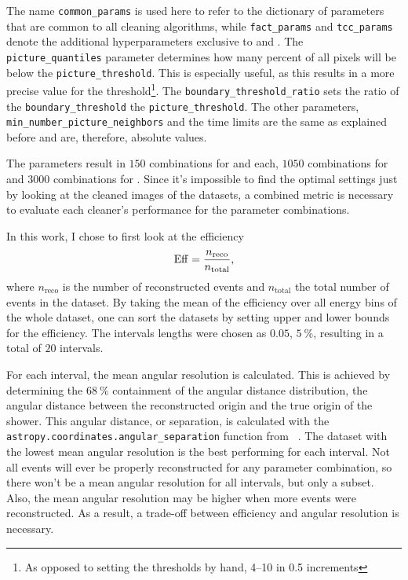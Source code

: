 The name \texttt{common\_params} is used here to refer to the dictionary of parameters that are common
to all cleaning algorithms, while \texttt{fact\_params} and \texttt{tcc\_params} denote the additional
hyperparameters exclusive to \fact{} and \tcc{}. The \texttt{picture\_quantiles} parameter determines
how many percent of all pixels will be below the \texttt{picture\_threshold}. This is especially useful,
as this results in a more precise value for the threshold\footnote{As opposed to setting the thresholds by hand, \eg{} \numrange{4}{10} in \num{0.5} increments}.
The \texttt{boundary\_threshold\_ratio} sets
the ratio of the \texttt{boundary\_threshold} \wrt the \texttt{picture\_threshold}. The other parameters,
\texttt{min\_number\_picture\_neighbors} and the time limits are the same as explained before and are,
therefore, absolute values.

The parameters result in \(\num{150}\) combinations for \tailcuts{} and \mars{} each, \(\num{1050}\) combinations for
\fact{} and \(\num{3000}\) combinations for \tcc{}.
Since it's impossible to find the optimal settings just by looking at the
cleaned images of the datasets, a combined metric is necessary to evaluate each cleaner's performance
for the parameter combinations.

In this work, I chose to first look at the efficiency
\begin{equation}\label{eq:efficiency}
    \operatorname{Eff} =  \frac{n_{\mathrm{reco}}}{n_{\mathrm{total}}},
\end{equation}
where \(n_{\mathrm{reco}}\) is the number of reconstructed events and \(n_{\mathrm{total}}\)
the total number of events in the dataset. By taking the mean of the efficiency over all energy bins
of the whole dataset, one can sort the datasets by setting upper and lower bounds for the efficiency.
The intervals lengths were chosen as \(\num{0.05}\), \ie \(\SI{5}{\percent}\), resulting in a total
of \(\num{20}\) intervals.

For each interval, the mean angular resolution is calculated. This is achieved by determining the
\(\SI{68}{\percent}\) containment of the angular distance distribution, \ie the angular distance
between the reconstructed origin and the true origin of the shower. This angular distance, or separation, is calculated
with the \texttt{astropy.coordinates.angular\_separation} function from \astropy{}~\cite{astropy1, astropy2}. The dataset with the lowest
mean angular resolution is the best performing for each interval. Not all events will ever be properly reconstructed
for any parameter combination, so there won't be a mean angular resolution for all intervals, but only
a subset. Also, the mean angular resolution may be higher when more events were reconstructed.
As a result, a trade-off between efficiency and angular resolution is necessary.

